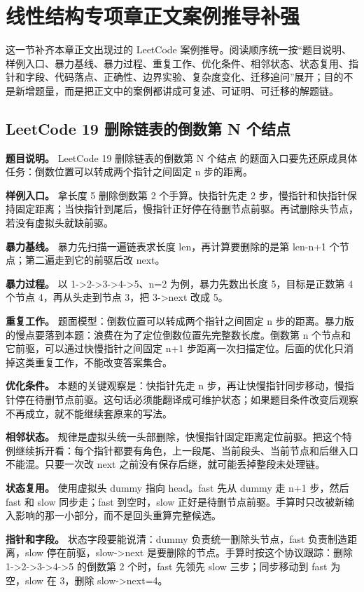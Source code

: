 \section{线性结构专项章正文案例推导补强}

这一节补齐本章正文出现过的 LeetCode 案例推导。阅读顺序统一按“题目说明、样例入口、暴力基线、暴力过程、重复工作、优化条件、相邻状态、状态复用、指针和字段、代码落点、正确性、边界实验、复杂度变化、迁移追问”展开；目的不是新增题量，而是把正文中的案例都讲成可复述、可证明、可迁移的解题链。

\subsection{LeetCode 19 删除链表的倒数第 N 个结点}

\textbf{题目说明。} LeetCode 19 删除链表的倒数第 N 个结点 的题面入口要先还原成具体任务：倒数位置可以转成两个指针之间固定 n 步的距离。

\textbf{样例入口。} 拿长度 5 删除倒数第 2 个手算。快指针先走 2 步，慢指针和快指针保持固定距离；当快指针到尾后，慢指针正好停在待删节点前驱。再试删除头节点，若没有虚拟头就缺前驱。

\textbf{暴力基线。} 暴力先扫描一遍链表求长度 len，再计算要删除的是第 len-n+1 个节点；第二遍走到它的前驱后改 next。

\textbf{暴力过程。} 以 1->2->3->4->5、n=2 为例，暴力先数出长度 5，目标是正数第 4 个节点 4，再从头走到节点 3，把 3->next 改成 5。

\textbf{重复工作。} 题面模型：倒数位置可以转成两个指针之间固定 n 步的距离。暴力版的慢点要落到本题：浪费在为了定位倒数位置先完整数长度。倒数第 n 个节点和它前驱，可以通过快慢指针之间固定 n+1 步距离一次扫描定位。后面的优化只消掉这类重复工作，不能改变答案集合。

\textbf{优化条件。} 本题的关键观察是：快指针先走 n 步，再让快慢指针同步移动，慢指针停在待删节点前驱。这句话必须能翻译成可维护状态；如果题目条件改变后观察不再成立，就不能继续套原来的写法。

\textbf{相邻状态。} 规律是虚拟头统一头部删除，快慢指针固定距离定位前驱。把这个特例继续拆开看：每个指针都要有角色，上一段尾、当前段头、当前节点和后继入口不能混。只要一次改 next 之前没有保存后继，就可能丢掉整段未处理链。

\textbf{状态复用。} 使用虚拟头 dummy 指向 head。fast 先从 dummy 走 n+1 步，然后 fast 和 slow 同步走；fast 到空时，slow 正好是待删节点前驱。手算时只改被新输入影响的那一小部分，而不是回头重算完整候选。

\textbf{指针和字段。} 状态字段要能说清：dummy 负责统一删除头节点，fast 负责制造距离，slow 停在前驱，slow->next 是要删除的节点。手算时按这个协议跟踪：删除 1->2->3->4->5 的倒数第 2 个时，fast 先领先 slow 三步；同步移动到 fast 为空，slow 在 3，删除 slow->next=4。

